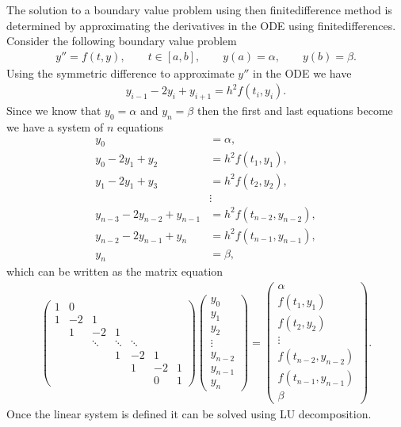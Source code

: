 \documentclass[letterpaper,10pt,english]{jupyterBook}
\begin{document}
\sphinxAtStartPar
The solution to a boundary value problem using then finite\sphinxhyphen{}difference method is determined by approximating the derivatives in the ODE using finite\sphinxhyphen{}differences. Consider the following boundary value problem
\begin{align*}
    y'' = f(t,y), \qquad t \in [a, b], \qquad y(a) = \alpha, \qquad y(b) = \beta.
\end{align*}
\sphinxAtStartPar
Using the symmetric difference to approximate \(y''\) in the ODE we have
\begin{align*}
    y_{i-1} - 2y_i + y_{i+1} = h^2 f(t_i ,y_i).
\end{align*}
\sphinxAtStartPar
Since we know that \(y_0 = \alpha\) and \(y_n = \beta\) then the first and last equations become we have a system of \(n\) equations
\begin{align*}
    y_0 &= \alpha, \\
    y_0 - 2y_1 + y_2 &= h^2 f(t_1, y_1), \\
    y_1 - 2y_1 + y_3 &= h^2 f(t_2, y_2), \\
    & \vdots \\
    y_{n-3} - 2y_{n-2} + y_{n-1} &= h^2 f(t_{n-2}, y_{n-2}), \\
    y_{n-2} - 2y_{n-1} + y_{n} &= h^2 f(t_{n-1}, y_{n-1}), \\
    y_{n} &= \beta,
\end{align*}
\sphinxAtStartPar
which can be written as the matrix equation
\begin{align*}
    \begin{pmatrix}
        1 & 0 &  &  \\
        1 & -2 & 1 &  & & \\
        & 1 & -2 & 1 & & \\
        & & \ddots & \ddots & \ddots & \\
        & & & 1 & -2 & 1 \\
        & & & & 1 & -2 & 1 \\
        & & & & & 0 & 1
    \end{pmatrix}
    \begin{pmatrix} y_0 \\ y_1 \\ y_2 \\ \vdots \\ y_{n-2} \\ y_{n-1} \\ y_n \end{pmatrix} =
    \begin{pmatrix} \alpha \\ f(t_1, y_1) \\ f(t_2, y_2) \\ \vdots \\ f(t_{n-2},y_{n-2}) \\ f(t_{n-1}, y_{n-1}) \\ \beta \end{pmatrix}.
\end{align*}
\sphinxAtStartPar
Once the linear system is defined it can be solved using LU decomposition.
\end{document}
